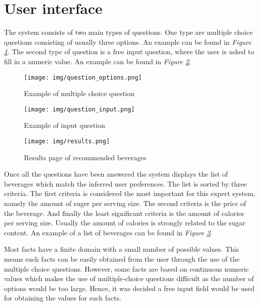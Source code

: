 \documentclass[11pt,a4paper]{article}
\begin{document}
\section{User interface}

The system consists of two main types of questions. One type are multiple choice questions consisting of usually three options. An example can be found in \textit{Figure \ref{fig:question-options}}. The second type of question is a free input question, where the user is asked to fill in a numeric value. An example can be found in \textit{Figure \ref{fig:question-input}}.

\begin{figure}[!h]
	\centering
	\texttt{[image: img/question\_options.png]}
	\caption{Example of multiple choice question}
	\label{fig:question-options}
\end{figure}

\begin{figure}[!h]
	\centering
	\texttt{[image: img/question\_input.png]}
	\caption{Example of input question}
	\label{fig:question-input}
\end{figure}

\begin{figure}[!h]
	\centering
	\texttt{[image: img/results.png]}
	\caption{Results page of recommended beverages}
	\label{fig:results}
\end{figure}

Once all the questions have been answered the system displays the list of beverages which match the inferred user preferences. The list is sorted by three criteria. The first criteria is considered the most important for this expert system, namely the amount of suger per serving size. The second criteria is the price of the beverage. And finally the least significant criteria is the amount of calories per serving size. Usually the amount of calories is strongly related to the sugar content. An example of a list of beverages can be found in \textit{Figure \ref{fig:results}}.

Most facts have a finite domain with a small number of possible values. This means such facts can be easily obtained from the user through the use of the multiple choice questions. However, some facts are based on continuous numeric values which makes the use of multiple-choice questions difficult as the number of options would be too large. Hence, it was decided a free input field would be used for obtaining the values for such facts.     
\end{document}
